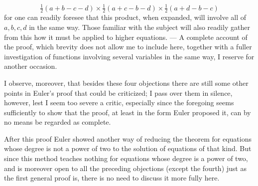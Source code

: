 \[
\tfrac12(a+b-c-d)\times\tfrac12(a+c-b-d)\times\tfrac12(a+d-b-c)
\]
for one can readily foresee that this product, when expanded, will involve all of $a,b,c,d$ in the same way. Those familiar with the subject will also readily gather from this how it must be applied to higher equations. --- A complete account of the proof, which brevity does not allow me to include here, together with a fuller investigation of functions involving several variables in the same way, I reserve for another occasion.

I observe, moreover, that besides these four objections there are still some other points in Euler's proof that could be criticized; I pass over them in silence, however, lest I seem too severe a critic, especially since the foregoing seems sufficiently to show that the proof, at least in the form Euler proposed it, can by no means be regarded as complete.

After this proof Euler showed another way of reducing the theorem for equations whose degree is not a power of two to the solution of equations of that kind. But since this method teaches nothing for equations whose
degree is a power of two, and is moreover open to all the preceding objections (except the fourth) just as the first general proof is, there is no need to discuss it more fully here.
